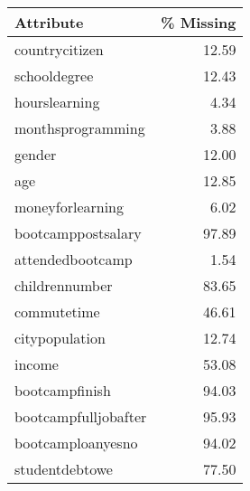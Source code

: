\begin{tabular}{lr}
\toprule
            Attribute &  \% Missing \\
\midrule
       countrycitizen &      12.59 \\
         schooldegree &      12.43 \\
        hourslearning &       4.34 \\
    monthsprogramming &       3.88 \\
               gender &      12.00 \\
                  age &      12.85 \\
     moneyforlearning &       6.02 \\
   bootcamppostsalary &      97.89 \\
     attendedbootcamp &       1.54 \\
       childrennumber &      83.65 \\
          commutetime &      46.61 \\
       citypopulation &      12.74 \\
               income &      53.08 \\
       bootcampfinish &      94.03 \\
 bootcampfulljobafter &      95.93 \\
    bootcamploanyesno &      94.02 \\
       studentdebtowe &      77.50 \\
\bottomrule
\end{tabular}
